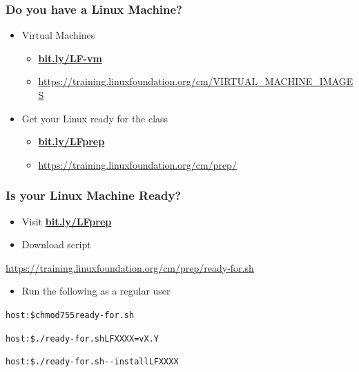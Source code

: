 \documentclass[bigger]{beamer}
\newcommand{\mycourse}{LFXXXX}
\newcommand{\myversion}{vX.Y}
\begin{document}
\begin{frame}
	\frametitle{Do you have a Linux Machine?}
	\LARGE
	\begin{itemize} 
		\item Virtual Machines
		\begin{itemize} 
			\item {\Large\textbf{\url{bit.ly/LF-vm}}}
			\item {\small\url{https://training.linuxfoundation.org/cm/VIRTUAL_MACHINE_IMAGES}}
		\end{itemize}
		\vspace{0.5em}
		\item Get your Linux ready for the class
		\begin{itemize} 
			\item {\Large\textbf{\url{bit.ly/LFprep}}}
			\item {\small\url{https://training.linuxfoundation.org/cm/prep/}}
		\end{itemize}
	\end{itemize}
\end{frame}

\begin{frame}
	\frametitle{Is your Linux Machine Ready?}
	\LARGE
	\begin{itemize} 
		\item {\Large{}Visit \textbf{\url{bit.ly/LFprep}}}
		\vspace{0.5em}
		\item Download script
	\end{itemize}
	\vspace{-0.5em}
	{\footnotesize\url{https://training.linuxfoundation.org/cm/prep/ready-for.sh}}
	\vspace{0.5em}
	\begin{itemize} 
		\item Run the following as a regular user
	\end{itemize}
        \large
	\begin{alltt}
host:\$ chmod 755 ready-for.sh \par
host:\$ ./ready-for.sh \mycourse{}=\myversion{} \par
host:\$ ./ready-for.sh -{}-install \mycourse{}
	\end{alltt}
\end{frame}
\end{document}
